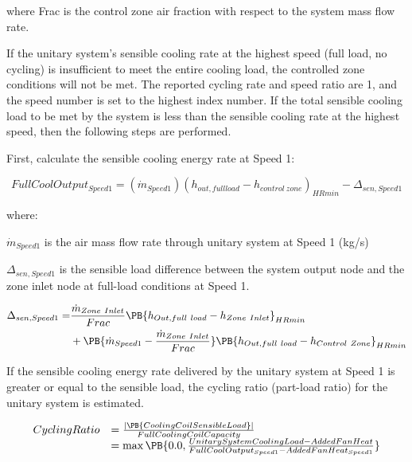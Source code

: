 where Frac is the control zone air fraction with respect to the system mass flow rate.

If the unitary system's sensible cooling rate at the highest speed (full load, no cycling) is insufficient to meet the entire cooling load, the controlled zone conditions will not be met. The reported cycling rate and speed ratio are 1, and the speed number is set to the highest index number. If the total sensible cooling load to be met by the system is less than the sensible cooling rate at the highest speed, then the following steps are performed.

First, calculate the sensible cooling energy rate at Speed 1:

\begin{equation}
FullCoolOutpu{t_{Speed1}} = ({\dot m_{Speed1}}){({h_{out,fullload}} - {h_{control~zone}})_{HRmin}} - {\Delta_{sen,Speed1}}
\end{equation}

where:

\emph{\({\dot m_{Speed1}}\)} is the air mass flow rate through unitary system at Speed 1 (kg/s)

\(\Delta_{sen,Speed1}\) is the sensible load difference between the system output node and the zone inlet node at full-load conditions at Speed 1.

\begin{equation}
  \begin{split}
    \Delta_{sen,Speed1} =& \frac{\dot{m}_{Zone~Inlet}}{Frac} \PB{h_{Out,full~load} - h_{Zone~Inlet}}_{HRmin} \\
                              &+ \PB{\dot{m}_{Speed1} - \frac{\dot{m}_{Zone~Inlet}}{Frac}} \PB{h_{Out,full~load} - h_{Control~Zone}}_{HRmin}
  \end{split}
\end{equation}

If the sensible cooling energy rate delivered by the unitary system at Speed 1 is greater or equal to the sensible load, the cycling ratio (part-load ratio) for the unitary system is estimated.

\begin{equation}
  \begin{array}{rl}
    CyclingRatio &= \frac{ \left| \PB{CoolingCoilSensibleLoad} \right| } {FullCoolingCoilCapacity} \\ 
                 &= \max \PB{0.0,\frac{UnitarySystemCoolingLoad - AddedFanHeat}{FullCoolOutput_{Speed1} - AddedFanHeat_{Speed1}}}
  \end{array}
\end{equation}

